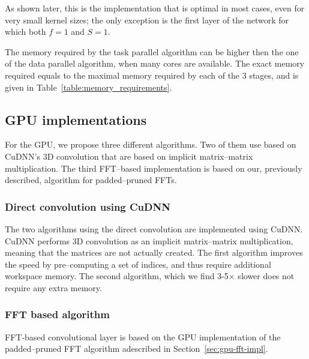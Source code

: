 \documentclass[conference]{IEEEtran}
\begin{document}
  As shown later, this is the implementation that is optimal in most
  cases, even for very small kernel sizes; the only exception is the
  first layer of the network for which both $f = 1$ and $S = 1$.

  The memory required by the task parallel algorithm can be higher
  then the one of the data parallel algorithm, when many cores are
  available.  The exact memory required equals to the maximal memory
  required by each of the 3 stages, and is given in
  Table~\ref{table:memory_requirements}.


\subsection{GPU implementations}

  For the GPU, we propose three different algorithms.  Two of them use
  based on CuDNN's 3D convolution that are based on implicit
  matrix--matrix multiplication.  The third FFT--based implementation
  is based on our, previously described, algorithm for padded--pruned
  FFTs.

\subsubsection{Direct convolution using CuDNN}

  The two algorithms using the direct convolution are implemented
  using CuDNN.  CuDNN performs 3D convolution as an implicit
  matrix--matrix multiplication, meaning that the matrices are not
  actually created.  The first algorithm improves the speed by
  pre--computing a set of indices, and thus require additional
  workspace memory.  The second algorithm, which we find 3-5$\times$
  slower does not require any extra memory.

\subsubsection{FFT based algorithm}

  FFT-based convolutional layer is based on the GPU implementation of
  the padded--pruned FFT algorithm adescribed in
  Section~\ref{sec:gpu-fft-impl}.
\end{document}
